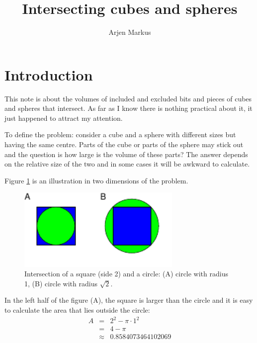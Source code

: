 \documentclass[onecolumn]{article}
\begin{document}
\title{Intersecting cubes and spheres}

\author{Arjen Markus}

\maketitle

\section*{Introduction}
This note is about the volumes of included and excluded bits and pieces of cubes and spheres that intersect.
As far as I know there is nothing practical about it, it just happened to attract my attention.

To define the problem: consider a cube and a sphere with different sizes but having the same centre.
Parts of the cube or parts of the sphere may stick out and the question is how large is the volume
of these parts? The answer depends on the relative size of the two and in some cases it will be
awkward to calculate.

Figure \ref{square_circle} is an illustration in two dimensions of the problem.

\begin{figure}[H]
\caption{Intersection of a square (side 2) and a circle: (A) circle with radius 1, (B) circle with radius $\sqrt{2}$.}
\label{square_circle}
\begin{center}
\includegraphics[width=0.7\textwidth]{circle_square_sketch.pdf}
\end{center}
\end{figure}

In the left half of the figure (A), the square is larger than the circle and it is easy to calculate
the area that lies outside the circle:
\begin{eqnarray}
\nonumber    A &=& 2^2 - \pi \cdot 1^2 \\
\nonumber      &=& 4 - \pi \\
\nonumber      &\approx& 0.8584073464102069
\end{eqnarray}
\end{document}
